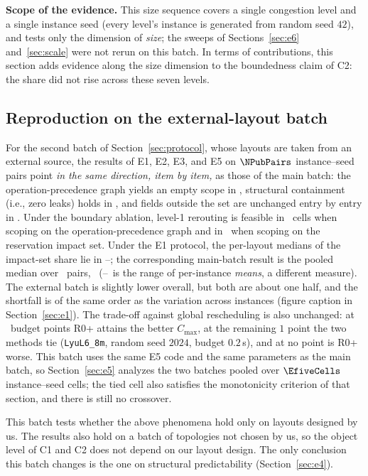 \textbf{Scope of the evidence.} This size sequence covers a single congestion level and a single instance seed (every level's instance is generated from random seed
\(42\)), and tests only the dimension of \emph{size}; the sweeps of Sections~\ref{sec:e6} and~\ref{sec:scale} were not rerun on this batch.
In terms of contributions, this section adds evidence along the size dimension to the boundedness claim of C2: the share did not rise across these seven levels.

\subsection{Reproduction on the external-layout batch}
\label{sec:pubrepro}

For the second batch of Section~\ref{sec:protocol}, whose layouts are taken from an external source, the results of E1, E2, E3, and E5 on \(\NPubPairs\) instance--seed pairs
point \emph{in the same direction, item by item,} as those of the main batch:
the operation-precedence graph yields an empty scope in \PubPassMiss, structural containment (i.e., zero leaks) holds in \PubPassClosed,
and fields outside the set are unchanged entry by entry in \PubPassInvar. Under the boundary ablation, level-1 rerouting is feasible in \PubFeasRone\ cells when scoping on the operation-precedence graph and
in \PubFeasRtwo\ when scoping on the reservation impact set. Under the E1 protocol, the per-layout medians of the impact-set share lie in
\PubEoneFracLo--\PubEoneFracHi; the corresponding main-batch result is the pooled median over \NPairs\ pairs, \EoneFracMed\
(\EoneCloLo--\EoneCloHi\ is the range of per-instance \emph{means}, a different measure).
The external batch is slightly lower overall, but both are about one half, and the shortfall is of the same order as the variation across instances (figure caption in Section~\ref{sec:e1}).
The trade-off against global rescheduling is also unchanged: at \PubEfiveNoCross\ budget points R0+ attains the better \(C_{\max}\),
at the remaining \(1\) point the two methods tie (\texttt{LyuL6\_8m}, random seed \(2024\), budget \(0.2\)\,s), and at no point is R0+ worse.
This batch uses the same E5 code and the same parameters as the main batch, so Section~\ref{sec:e5} analyzes the two batches pooled over \(\EfiveCells\)
instance--seed cells; the tied cell also satisfies the monotonicity criterion of that section, and there is still no crossover.

This batch tests whether the above phenomena hold only on layouts designed by us. The results also hold on a batch of topologies not chosen by us,
so the object level of C1 and C2 does not depend on our layout design. The only conclusion this batch changes is the one on structural predictability (Section~\ref{sec:e4}).

